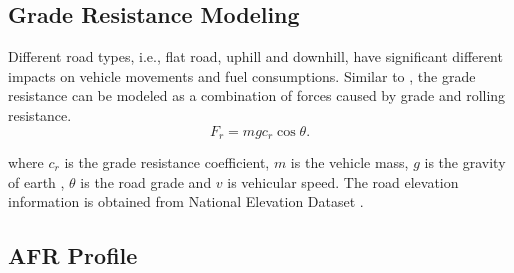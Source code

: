 \subsection{Grade Resistance Modeling}



Different road types, i.e., flat road, uphill and downhill, 
have significant different impacts on vehicle movements and
fuel consumptions. 
Similar to \cite{andersson2012online}, 
the grade resistance can be modeled as a combination
of forces caused by grade and rolling resistance.
\begin{equation}
    F_r = mgc_r\cos{\theta}.
 \end{equation}
 
where $c_r$ is the grade resistance coefficient, 
$m$ is the vehicle mass, $g$ is the gravity of earth
, $\theta$ is the road grade and $v$ is vehicular speed.
The road elevation information is obtained from
National Elevation Dataset \cite{nationalelevation}. 




\subsection{AFR Profile}

